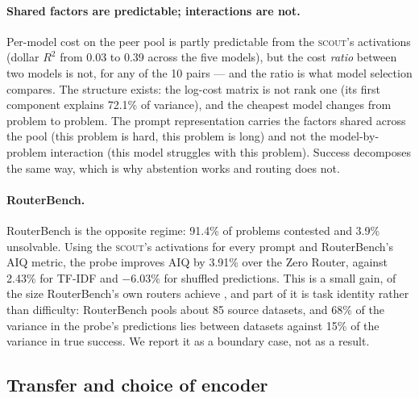 \documentclass[10pt]{article} %
\newcommand{\scout}{\textsc{scout}\xspace}
\begin{document}
\paragraph{Shared factors are predictable; interactions are not.}
Per-model cost on the peer pool is partly predictable from the \scout's activations (dollar $R^2$
from 0.03 to 0.39 across the five models), but the cost \emph{ratio} between two models is not,
for any of the 10 pairs --- and the ratio is what model selection compares.  The structure exists:
the log-cost matrix is not rank one (its first component explains 72.1\% of variance), and the
cheapest model changes from problem to problem.  The prompt representation carries the factors
shared across the pool (this problem is hard, this problem is long) and not the model-by-problem
interaction (this model struggles with this problem).  Success decomposes the same way, which is
why abstention works and routing does not.

\paragraph{RouterBench.}
RouterBench is the opposite regime: 91.4\% of problems contested and 3.9\% unsolvable.  Using the
\scout's activations for every prompt and RouterBench's AIQ metric, the probe improves AIQ by
3.91\% over the Zero Router, against 2.43\% for TF-IDF and $-6.03\%$ for shuffled predictions.
This is a small gain, of the size RouterBench's own routers achieve \citep{hu2024routerbench},
and part of it is task identity rather than difficulty: RouterBench pools about 85 source
datasets, and 68\% of the variance in the probe's predictions lies between datasets against 15\%
of the variance in true success.  We report it as a boundary case, not as a result.

\subsection{Transfer and choice of encoder}
\label{sec:transfer}
\end{document}

